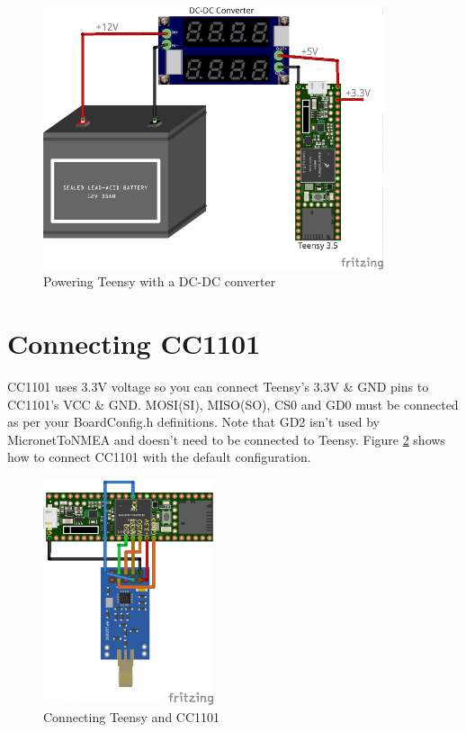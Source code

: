 \documentclass{report}
\begin{document}
\begin{figure}
\centering

\includegraphics[width=100mm]{MicronetToNMEA_DC_Power.png}
	\caption{Powering Teensy with a DC-DC converter}
\label{figure:dcpower}
\end{figure}

\section{Connecting CC1101}

CC1101 uses 3.3V voltage so you can connect Teensy's 3.3V \& GND pins to CC1101's VCC \& GND. MOSI(SI), MISO(SO), CS0 and GD0 must be connected as per your BoardConfig.h definitions. Note that GD2 isn't used by MicronetToNMEA and doesn't need to be connected to Teensy. Figure \ref{figure:cc1101} shows how to connect CC1101 with the default configuration.

\begin{figure}[h]
	\centering
	\includegraphics[width=50mm]{MicronetToNMEA_CC1101.png}
	\caption{Connecting Teensy and CC1101}
	\label{figure:cc1101}
\end{figure}
\end{document}
